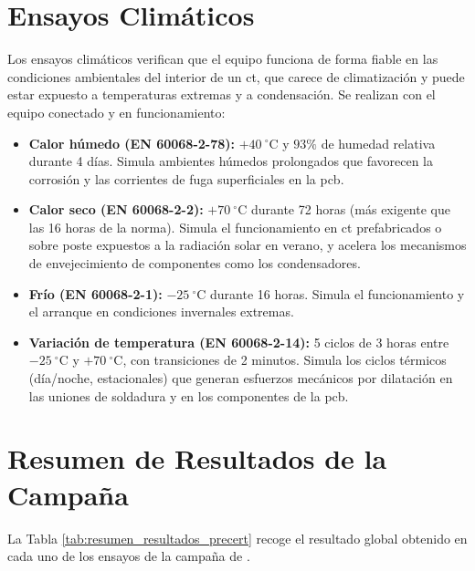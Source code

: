 \section{Ensayos Climáticos}
\label{sec:ensayos_climaticos}

Los ensayos climáticos verifican que el equipo funciona de forma fiable en las condiciones ambientales del interior de un \gls{ct}, que carece de climatización y puede estar expuesto a temperaturas extremas y a condensación. Se realizan con el equipo conectado y en funcionamiento:

\begin{itemize}
    \item \textbf{Calor húmedo (EN 60068-2-78):} $+40\ ^\circ\text{C}$ y $93\%$ de humedad relativa durante 4 días. Simula ambientes húmedos prolongados que favorecen la corrosión y las corrientes de fuga superficiales en la \gls{pcb}.
    \item \textbf{Calor seco (EN 60068-2-2):} $+70\ ^\circ\text{C}$ durante 72 horas (más exigente que las 16 horas de la norma). Simula el funcionamiento en \gls{ct} prefabricados o sobre poste expuestos a la radiación solar en verano, y acelera los mecanismos de envejecimiento de componentes como los condensadores.
    \item \textbf{Frío (EN 60068-2-1):} $-25\ ^\circ\text{C}$ durante 16 horas. Simula el funcionamiento y el arranque en condiciones invernales extremas.
    \item \textbf{Variación de temperatura (EN 60068-2-14):} 5 ciclos de 3 horas entre $-25\ ^\circ\text{C}$ y $+70\ ^\circ\text{C}$, con transiciones de 2 minutos. Simula los ciclos térmicos (día/noche, estacionales) que generan esfuerzos mecánicos por dilatación en las uniones de soldadura y en los componentes de la \gls{pcb}.
\end{itemize}

\section{Resumen de Resultados de la Campaña}
\label{sec:resumen_resultados_precert}

La Tabla \ref{tab:resumen_resultados_precert} recoge el resultado global obtenido en cada uno de los ensayos de la campaña de .

